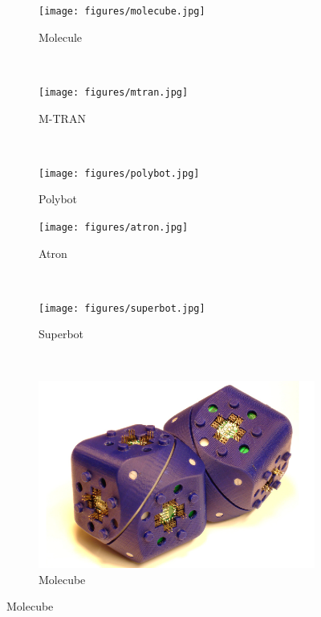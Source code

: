 \begin{figure}[!t]
    \centering
    \begin{subfigure}[b]{0.315\textwidth}
        \centering
        \texttt{[image: figures/molecube.jpg]}
        \caption{Molecule}
    \end{subfigure}
    ~
    \begin{subfigure}[b]{0.315\textwidth}
        \centering
        \texttt{[image: figures/mtran.jpg]}
        \caption{M-TRAN}
    \end{subfigure}
    ~
    \begin{subfigure}[b]{0.315\textwidth}
        \centering
        \texttt{[image: figures/polybot.jpg]}
        \caption{Polybot}
    \end{subfigure}

    \begin{subfigure}[b]{0.315\textwidth}
        \centering
        \texttt{[image: figures/atron.jpg]}
        \caption{Atron}
    \end{subfigure}
    ~
    \begin{subfigure}[b]{0.315\textwidth}
        \centering
        \texttt{[image: figures/superbot.jpg]}
        \caption{Superbot}
    \end{subfigure}
    ~
    \begin{subfigure}[b]{0.315\textwidth}
        \centering
        \includegraphics[width=\textwidth,height=\textwidth,keepaspectratio]{figures/molecube.png}
        \caption{Molecube}
    \end{subfigure}


\end{figure}
